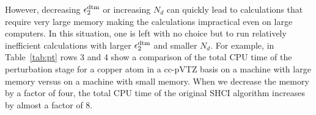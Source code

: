 \documentclass[%
preprint,
 superscriptaddress,
 amsmath,amssymb,
 aps,
]{revtex4-1}
\begin{document}
However, decreasing $\epsilon_2^{\rm dtm}$ or increasing $N_d$ can quickly lead to calculations that require very large memory
making the calculations impractical even on large computers. In this situation, one is left with no choice but to run relatively
inefficient calculations with larger $\epsilon_2^{\rm dtm}$ and smaller $N_d$.
For example, in Table~\ref{tab:pt} rows 3 and 4 show a comparison of the total CPU time of the perturbation stage
for a copper atom in a cc-pVTZ basis on a machine with large memory versus on a machine with small memory.
When we decrease the memory by a factor of four, the total CPU time of the original SHCI algorithm increases by almost a factor of 8.

\end{document}
